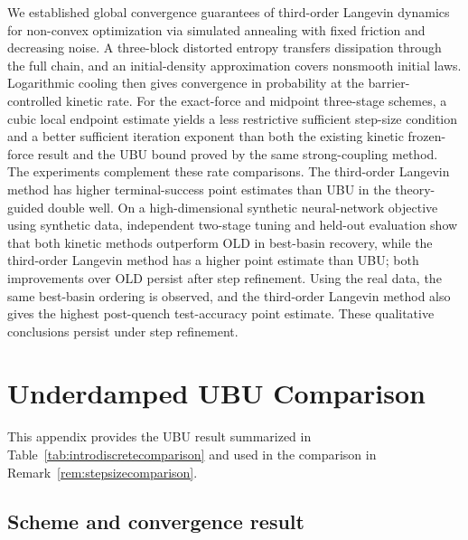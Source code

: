 \documentclass[11pt]{article}
\theoremstyle{definition}
\begin{document}
We established global convergence guarantees of third-order Langevin dynamics for non-convex optimization
via simulated annealing with fixed friction and decreasing noise.  A three-block distorted entropy transfers
dissipation through the full chain, and an initial-density approximation covers
nonsmooth initial laws.  Logarithmic cooling then gives convergence in
probability at the barrier-controlled kinetic rate.  For the exact-force and
midpoint three-stage schemes, a cubic local endpoint estimate yields a less
restrictive sufficient step-size condition and a better sufficient iteration
exponent than both the existing kinetic frozen-force result and the UBU bound
proved by the same strong-coupling method.
The experiments complement these rate comparisons.  The third-order Langevin method
has higher terminal-success point estimates than UBU in the theory-guided
double well.  On a high-dimensional synthetic neural-network objective using synthetic data,
independent two-stage tuning and held-out evaluation show that both kinetic
methods outperform OLD in best-basin recovery, while the third-order Langevin
method has a higher point estimate than UBU; both improvements over OLD persist
after step refinement.
Using the real data, the same best-basin ordering is observed,
and the third-order Langevin method also gives the highest post-quench test-accuracy
point estimate. These qualitative conclusions persist under step refinement.




\appendix

\section{Underdamped UBU Comparison}\label{sec:ubuappendix}

This appendix provides the UBU result summarized in
Table~\ref{tab:introdiscretecomparison} and used in the comparison in
Remark~\ref{rem:stepsizecomparison}.

\subsection{Scheme and convergence result}
\end{document}
